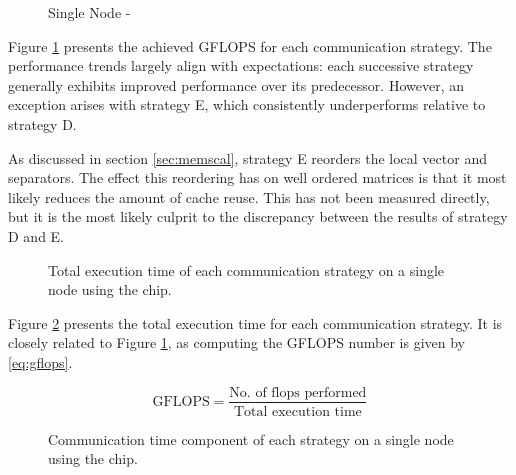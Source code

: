 \begin{figure}[H]
    \centering
    \caption{Single Node - }
    \label{fig:gflopsdefqsingle}
\end{figure}
Figure \ref{fig:gflopsdefqsingle} presents the achieved GFLOPS for each communication strategy. The performance trends largely align with expectations: each successive strategy generally exhibits improved performance over its predecessor. However, an exception arises with strategy E, which consistently underperforms relative to strategy D.
\medskip

As discussed in section \ref{sec:memscal}, strategy E reorders the local vector and separators. The effect this reordering has on well ordered matrices is that it most likely reduces the amount of cache reuse. This has not been measured directly, but it is the most likely culprit to the discrepancy between the results of strategy D and E.

 
\begin{figure}[H]
    \centering
    \caption{Total execution time of each communication strategy on a single node using the  chip.}
    \label{fig:tdefqsingle}
\end{figure}

Figure \ref{fig:tdefqsingle} presents the total execution time for each communication strategy. It is closely related to Figure \ref{fig:gflopsdefqsingle}, as computing the GFLOPS number is given by \ref{eq:gflops}.

\begin{equation}
    \label{eq:gflops}
    \text{GFLOPS} = \frac{\text{No. of flops performed}}{\text{Total execution time}}
\end{equation}

\begin{figure}[H]
    \centering
    \caption{Communication time component of each strategy on a single node using the  chip.}
    \label{fig:tcommdefqsingle}
\end{figure}

